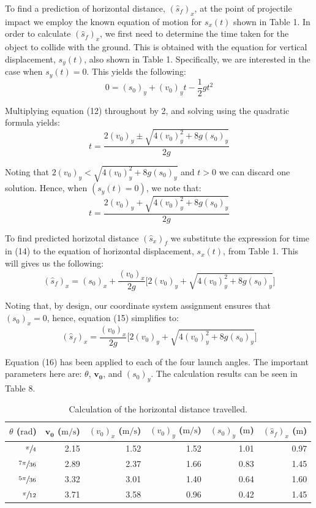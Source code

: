 \documentclass[a4paper]{article}
\begin{document}
To find a prediction of horizontal distance, $(\hat{s}_f)_x$, at the point of projectile impact we employ the known equation of motion for $s_x(t)$ shown in Table 1. In order to calculate $(\hat{s}_f)_x$, we first need to determine the time taken for the object to collide with the ground. This is obtained with the equation for vertical displacement, $s_y(t)$, also shown in Table 1. Specifically, we are interested in the case when $s_y(t) = 0$. This yields the following:
\begin{equation}
0 = (s_0)_y + (v_0)_y t - \frac{1}{2}gt^2
\end{equation}

Multiplying equation (12) throughout by 2, and solving using the quadratic formula yields:
\begin{equation}
t = \frac{2(v_0)_y \pm \sqrt{4(v_0)_y^2 + 8g(s_0)_y}}{2g}
\end{equation} 

Noting that $2(v_0)_y < \sqrt{4(v_0)_y^2 + 8g(s_0)_y}$ and $t>0$ we can discard one solution. Hence, when $(s_y(t) = 0)$, we note that:
\begin{equation}
t = \frac{2(v_0)_y + \sqrt{4(v_0)_y^2 + 8g(s_0)_y}}{2g}
\end{equation}

To find predicted horizotal distance ${(\hat{s}_x)_f}$ we substitute the expression for time in (14) to the equation of horizontal displacement, $s_x(t)$, from Table 1. This will gives us the following:
\begin{equation}
(\hat{s}_f)_x = (s_0)_x + \frac{(v_0)_x}{2g} \bigg[2(v_0)_y + \sqrt{4(v_0)_y^2 + 8g(s_0)_y}\bigg]
\end{equation}

Noting that, by design, our coordinate system assignment ensures that $(s_0)_x = 0$, hence, equation (15) simplifies to:
\begin{equation}
(\hat{s}_f)_x = \frac{(v_0)_x}{2g} \bigg[2(v_0)_y + \sqrt{4(v_0)_y^2 + 8g(s_0)_y}\bigg]
\end{equation}

Equation (16) has been applied to each of the four launch angles. The important parameters here are: $\theta$, $\boldsymbol{v_0}$, and $(s_0)_y$. The calculation results can be seen in Table 8.
\begin{table}[h]
	\centering
	\caption{Calculation of the horizontal distance travelled.}
	\begin{tabular}{rrrrrr}
		\toprule
		$\theta$ ($\si{\radian}$) & $\boldsymbol{v_0}$ ($\si{\meter\per\second}$) & $(v_0)_x$ ($\si{\meter\per\second}$) & $(v_0)_y$ ($\si{\meter\per\second}$) & $(s_0)_y$ ($\si{\meter}$) & $(\hat{s}_f)_x$ ($\si{\meter}$)\\
		\midrule
		$\sfrac{\pi}{4}$ & 2.15 & 1.52 & 1.52 & 1.01 & 0.97 \\
		$\sfrac{7\pi}{36}$ & 2.89 & 2.37 & 1.66 & 0.83 & 1.45 \\
		$\sfrac{5\pi}{36}$ & 3.32 & 3.01 & 1.40 & 0.64 & 1.60 \\
		$\sfrac{\pi}{12}$ & 3.71 & 3.58 & 0.96 & 0.42 & 1.45 \\
		\bottomrule
	\end{tabular}
\end{table}
\end{document}
